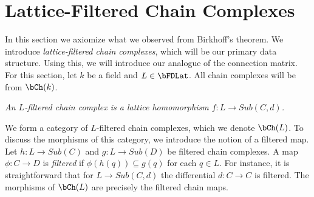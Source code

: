 %
%
%
%
%
%

\section{Lattice-Filtered Chain Complexes}\label{sec:cf}

In this section we axiomize what we observed from Birkhoff's theorem.  We introduce {\em lattice-filtered chain complexes}, which will be our primary data structure.   Using this, we will introduce our analogue of the connection matrix.  For this section, let $k$ be a field and $L\in \bFDLat$.  All chain complexes will be from $\bCh(k)$.

\begin{defn}
{\em
An {\em $L$-filtered chain complex} is a lattice homomorphism $f:L\to Sub(C,d)$.
}
\end{defn}

We form a category of $L$-filtered chain complexes, which we denote $\bCh(L)$.  To discuss the morphisms of this category, we introduce the notion of a filtered map.  Let $h:L\to Sub(C)$ and $g:L\to Sub(D)$ be filtered chain complexes. A map $\phi:C\to D$ is {\em filtered} if $\phi(h(q))\subseteq g(q)$ for each $q\in L$.  For instance, it is straightforward that for $L\to Sub(C,d)$ the differential $d:C\to C$ is filtered.  The morphisms of $\bCh(L)$ are precisely the filtered chain maps.


